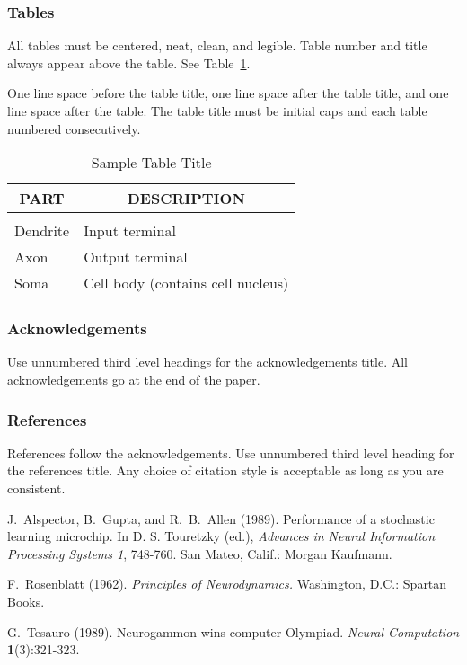\subsubsection{Tables} 
 
All tables must be centered, neat, clean, and legible. Table number
and title always appear above the table.  See
Table~\ref{sample-table}.
 
One line space before the table title, one line space after the table
title, and one line space after the table. The table title must be
initial caps and each table numbered consecutively.
 
\begin{table}[h] 
\caption{Sample Table Title} 
\label{sample-table} 
\begin{center} 
\begin{tabular}{ll} 
\multicolumn{1}{c}{\bf PART}  &\multicolumn{1}{c}{\bf DESCRIPTION} \\ 
\hline \\ 
Dendrite         &Input terminal \\ 
Axon             &Output terminal \\ 
Soma             &Cell body (contains cell nucleus) \\ 
\end{tabular} 
\end{center} 
\end{table} 
 
\newpage 

\subsubsection*{Acknowledgements} 
 
Use unnumbered third level headings for the acknowledgements title.
All acknowledgements go at the end of the paper.
 
 
\subsubsection*{References} 
 
References follow the acknowledgements.  Use unnumbered third level
heading for the references title.  Any choice of citation style is
acceptable as long as you are consistent.
 
 
J.~Alspector, B.~Gupta, and R.~B.~Allen  (1989). Performance of a 
stochastic learning microchip.  In D. S. Touretzky (ed.), {\it Advances 
in Neural Information Processing Systems 1}, 748-760.  San Mateo, Calif.: 
Morgan Kaufmann. 
 
F.~Rosenblatt (1962). {\it Principles of Neurodynamics.} Washington, 
D.C.: Spartan Books. 
 
G.~Tesauro (1989). Neurogammon wins computer Olympiad.  {\it Neural 
Computation} {\bf 1}(3):321-323. 
 
 



